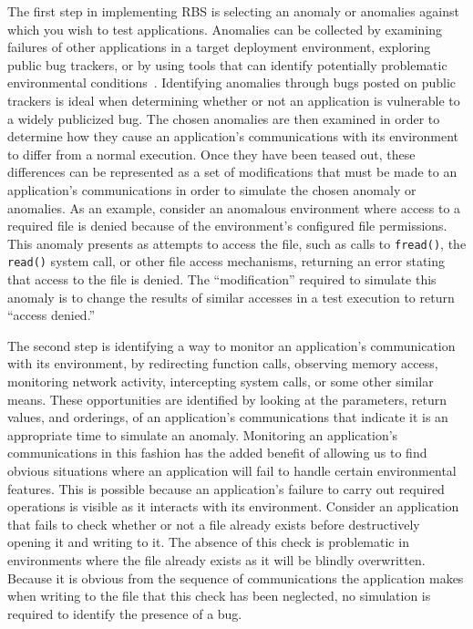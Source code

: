 The first step in implementing RBS
is selecting an anomaly or anomalies
against which you wish to test applications.
Anomalies can be collected
by examining failures of other applications
in a target deployment environment,
exploring public bug trackers,
or by using tools that can identify
potentially problematic environmental conditions~\cite{Zhuang_NSDI_2014,
rasley2015detecting}.
Identifying anomalies through bugs posted on public trackers
is ideal when determining
whether or not an application
is vulnerable to a widely publicized bug.
The chosen anomalies are then examined
in order to determine how they cause an application's communications
with its environment
to differ from a normal execution.
Once they have been teased out,
these differences can be represented
as a set of modifications
that must be made to an application's communications
in order to simulate the chosen anomaly or anomalies.
As an example,
consider an anomalous environment
where access to a required file is denied because of
the environment's configured file permissions.
This anomaly presents as attempts to access the file,
such as calls to {\tt fread()},
the {\tt read()} system call,
or other file access mechanisms,
returning an error stating that access to the file is denied.
The ``modification'' required to simulate this anomaly
is to change the results of similar accesses
in a test execution
to return ``access denied.''

The second step
is identifying
a way to monitor an application's communication
with its environment,
by redirecting function calls,
observing memory access,
monitoring network activity,
intercepting system calls,
or some other similar means.
These opportunities are identified by looking at the parameters,
return values,
and orderings,
of an application's communications
that indicate
it is an appropriate time to simulate an anomaly.
Monitoring an application's communications
in this fashion
has the added benefit
of allowing us to find obvious situations
where an application will fail
to handle certain environmental features.
This is possible because an application's failure
to carry out required operations is visible as it interacts
with its environment.
Consider an application that fails to check whether or not
a file already exists
before destructively opening it and writing to it.
The absence of this check
is problematic in environments where the file already exists
as it will be blindly overwritten.
Because it is obvious from the sequence of communications
the application makes when writing to the file
that this check has been neglected,
no simulation is required to identify the presence of a bug.


